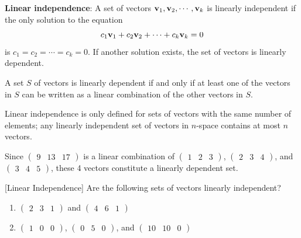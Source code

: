 \documentclass[]{book}
\providecommand{\tightlist}{%
  \setlength{\itemsep}{0pt}\setlength{\parskip}{0pt}}
\theoremstyle{definition}
\theoremstyle{definition}
\theoremstyle{definition}
\theoremstyle{remark}
\begin{document}
\textbf{Linear independence}: A set of vectors \({\bf v}_1, {\bf v}_2, \cdots , {\bf v}_k\) is linearly independent if the only solution to the equation
\[c_1{\bf v}_1 + c_2{\bf v}_2 +  \cdots + c_k{\bf v}_k = 0\]
is \(c_1 = c_2 = \cdots = c_k = 0\). If another solution exists, the set of vectors is linearly dependent.

A set \(S\) of vectors is linearly dependent if and only if at least one of the vectors in \(S\) can be written as a linear combination of the other vectors in \(S\).

Linear independence is only defined for sets of vectors with the same number of elements; any linearly independent set of vectors in \(n\)-space contains at most \(n\) vectors.

Since \(\begin{pmatrix}9 & 13 & 17 \end{pmatrix}\) is a linear combination of \(\begin{pmatrix}1 & 2 & 3 \end{pmatrix}\), \(\begin{pmatrix} 2 & 3& 4\end{pmatrix}\), and \(\begin{pmatrix} 3 & 4 & 5 \end{pmatrix}\), these 4 vectors constitute a linearly dependent set.

[Linear Independence]
\protect\hypertarget{exm:linearindep}{}{\label{exm:linearindep} {} }
Are the following sets of vectors linearly independent?

\begin{enumerate}
\def\labelenumi{\arabic{enumi}.}
\tightlist
\item
  \(\begin{pmatrix}2 & 3 & 1 \end{pmatrix}\) and \(\begin{pmatrix}4 & 6 & 1 \end{pmatrix}\)
\item
  \(\begin{pmatrix}1 & 0 & 0 \end{pmatrix}\), \(\begin{pmatrix}0 & 5 & 0 \end{pmatrix}\), and \(\begin{pmatrix}10 & 10 & 0 \end{pmatrix}\)
\end{enumerate}
\end{document}
